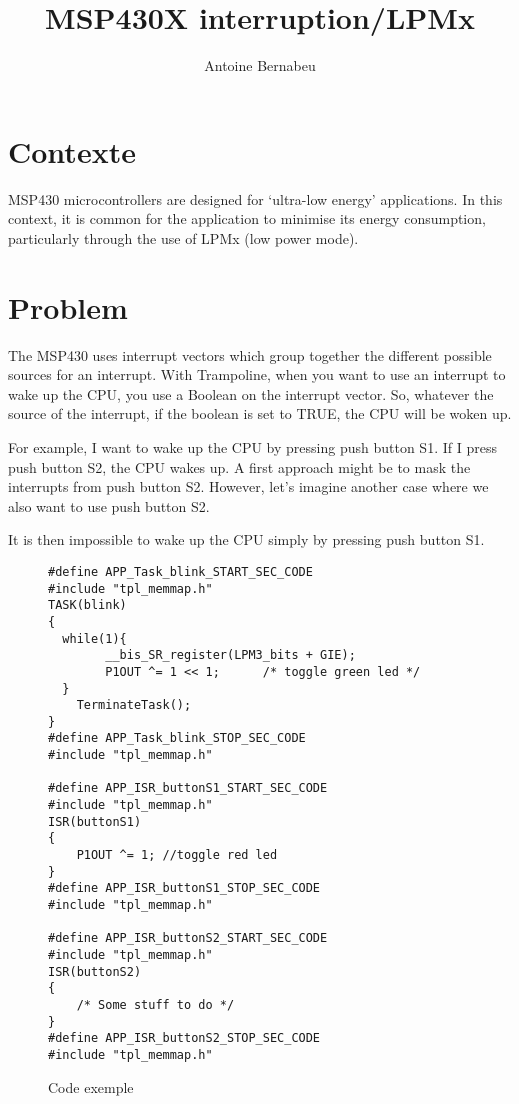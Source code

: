 \documentclass[11pt, oneside]{article}
\title{MSP430X interruption/LPMx}
\author{Antoine Bernabeu}
\begin{document}
\maketitle

\section{Contexte}
MSP430 microcontrollers are designed for ‘ultra-low energy’ applications.
In this context, it is common for the application to minimise its energy consumption, particularly through the use of LPMx (low power mode).

\section{Problem}
The MSP430 uses interrupt vectors which group together the different possible sources for an interrupt. 
With Trampoline, when you want to use an interrupt to wake up the CPU, you use a Boolean on the interrupt vector. So, whatever the source of the interrupt, if the boolean is set to TRUE, the CPU will be woken up.

For example, I want to wake up the CPU by pressing push button S1. If I press push button S2, the CPU wakes up. A first approach might be to mask the interrupts from push button S2.
However, let's imagine another case where we also want to use push button S2.

It is then impossible to wake up the CPU simply by pressing push button S1.

\begin{figure}
\caption{Code exemple}
\begin{lstlisting}
#define APP_Task_blink_START_SEC_CODE
#include "tpl_memmap.h"
TASK(blink)
{
  while(1){
    	__bis_SR_register(LPM3_bits + GIE);
    	P1OUT ^= 1 << 1;      /* toggle green led */
  }
	TerminateTask();
}
#define APP_Task_blink_STOP_SEC_CODE
#include "tpl_memmap.h"

#define APP_ISR_buttonS1_START_SEC_CODE
#include "tpl_memmap.h"
ISR(buttonS1)
{
	P1OUT ^= 1; //toggle red led
}
#define APP_ISR_buttonS1_STOP_SEC_CODE
#include "tpl_memmap.h"

#define APP_ISR_buttonS2_START_SEC_CODE
#include "tpl_memmap.h"
ISR(buttonS2)
{
	/* Some stuff to do */
}
#define APP_ISR_buttonS2_STOP_SEC_CODE
#include "tpl_memmap.h"
\end{lstlisting}
\label{Exemple Application}
\end{figure}
\end{document}
